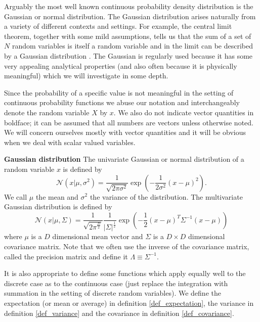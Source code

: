 Arguably the most well known continuous probability density distribution is the Gaussian or normal distribution. The Gaussian distribution arises naturally from a variety of different contexts and settings. For example, the central limit theorem, together with some mild assumptions, tells us that the sum of a set of $N$ random  variables is itself a random variable and in the limit can be described by a Gaussian distribution \cite{bishop}. The Gaussian is regularly used because it has some very appealing analytical properties (and also often because it is physically meaningful) which we will investigate in some depth. 

Since the probability of a specific value is not meaningful in the setting of continuous probability functions we abuse our notation and interchangeably denote the random variable $X$ by $x$. We also do not indicate vector quantities in boldface; it can be assumed that all numbers are vectors unless otherwise noted. We will concern ourselves mostly with vector quantities and it will be obvious when we deal with scalar valued variables. 
\begin{defn}
\textbf{Gaussian distribution} The univariate Gaussian or normal distribution of a random variable $x$ is defined by
\begin{equation}
\mathcal{N}(x|\mu, \sigma^2) = \frac{1}{\sqrt{2\pi\sigma^2}}\exp\left(-\frac{1}{2\sigma^2}(x-\mu)^2\right).
\label{eq_norm_uni}
\end{equation}
We call $\mu$ the mean and $\sigma^2$ the variance of the distribution. The multivariate Gaussian distribution is defined by
\begin{equation}
\mathcal{N}(x|\mu, \Sigma) = \frac{1}{\sqrt{2\pi^{\frac{D}{2}}}}\frac{1}{|\Sigma|^{\frac{1}{2}}}\exp\left(-\frac{1}{2}(x-\mu)^T\Sigma^{-1}(x-\mu)\right)
\label{eq_norm_multi}
\end{equation}
where $\mu$ is a $D$ dimensional mean vector and $\Sigma$ is a $D \times D$ dimensional covariance matrix. Note that we often use the inverse of the covariance matrix, called the precision matrix and define it $\Lambda \equiv \Sigma^{-1}$.
\label{defn_gauss}
\end{defn}
It is also appropriate to define some functions which apply equally well to the discrete case as to the continuous case (just replace the integration with summation in the setting of discrete random variables). We define the expectation (or mean or average) in definition \ref{def_expectation}, the variance in definition \ref{def_variance} and the covariance in definition \ref{def_covariance}. 
